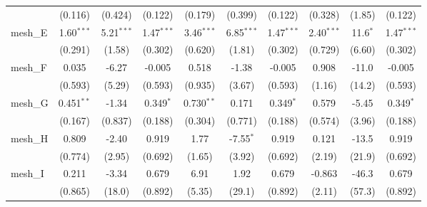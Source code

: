 \begin{tabular}{lccccccccc}
                                                               & (0.116)        & (0.424)        & (0.122)        & (0.179)        & (0.399)       & (0.122)        & (0.328)        & (1.85)         & (0.122)\\   
   mesh\_E                                                     & 1.60$^{***}$   & 5.21$^{***}$   & 1.47$^{***}$   & 3.46$^{***}$   & 6.85$^{***}$  & 1.47$^{***}$   & 2.40$^{***}$   & 11.6$^{*}$     & 1.47$^{***}$\\   
                                                               & (0.291)        & (1.58)         & (0.302)        & (0.620)        & (1.81)        & (0.302)        & (0.729)        & (6.60)         & (0.302)\\   
   mesh\_F                                                     & 0.035          & -6.27          & -0.005         & 0.518          & -1.38         & -0.005         & 0.908          & -11.0          & -0.005\\   
                                                               & (0.593)        & (5.29)         & (0.593)        & (0.935)        & (3.67)        & (0.593)        & (1.16)         & (14.2)         & (0.593)\\   
   mesh\_G                                                     & 0.451$^{**}$   & -1.34          & 0.349$^{*}$    & 0.730$^{**}$   & 0.171         & 0.349$^{*}$    & 0.579          & -5.45          & 0.349$^{*}$\\   
                                                               & (0.167)        & (0.837)        & (0.188)        & (0.304)        & (0.771)       & (0.188)        & (0.574)        & (3.96)         & (0.188)\\   
   mesh\_H                                                     & 0.809          & -2.40          & 0.919          & 1.77           & -7.55$^{*}$   & 0.919          & 0.121          & -13.5          & 0.919\\   
                                                               & (0.774)        & (2.95)         & (0.692)        & (1.65)         & (3.92)        & (0.692)        & (2.19)         & (21.9)         & (0.692)\\   
   mesh\_I                                                     & 0.211          & -3.34          & 0.679          & 6.91           & 1.92          & 0.679          & -0.863         & -46.3          & 0.679\\   
                                                               & (0.865)        & (18.0)         & (0.892)        & (5.35)         & (29.1)        & (0.892)        & (2.11)         & (57.3)         & (0.892)\\   

\end{tabular}

